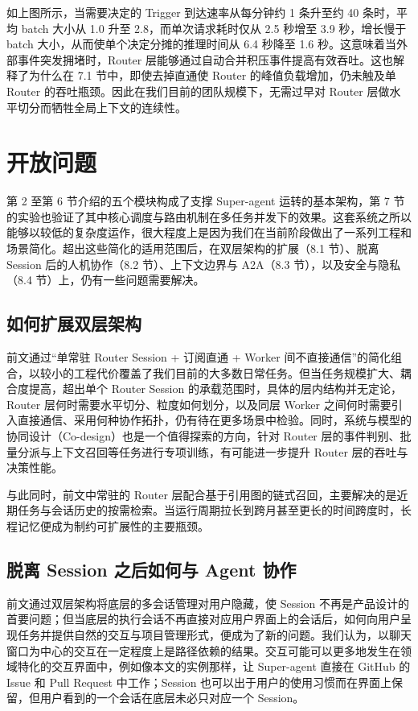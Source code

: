 \documentclass[11pt,a4paper,UTF8,fontset=windows]{ctexart}
\begin{document}
如上图所示，当需要决定的 Trigger 到达速率从每分钟约 1 条升至约 40 条时，平均 batch 大小从 1.0 升至 2.8，而单次请求耗时仅从 2.5 秒增至 3.9 秒，增长慢于 batch 大小，从而使单个决定分摊的推理时间从 6.4 秒降至 1.6 秒。这意味着当外部事件突发拥堵时，Router 层能够通过自动合并积压事件提高有效吞吐。这也解释了为什么在 7.1 节中，即使去掉直通使 Router 的峰值负载增加，仍未触及单 Router 的吞吐瓶颈。因此在我们目前的团队规模下，无需过早对 Router 层做水平切分而牺牲全局上下文的连续性。



\section{开放问题}

第 2 至第 6 节介绍的五个模块构成了支撑 Super-agent 运转的基本架构，第 7 节的实验也验证了其中核心调度与路由机制在多任务并发下的效果。这套系统之所以能够以较低的复杂度运作，很大程度上是因为我们在当前阶段做出了一系列工程和场景简化。超出这些简化的适用范围后，在双层架构的扩展（8.1 节）、脱离 Session 后的人机协作（8.2 节）、上下文边界与 A2A（8.3 节），以及安全与隐私（8.4 节）上，仍有一些问题需要解决。

\subsection{如何扩展双层架构}

前文通过“单常驻 Router Session + 订阅直通 + Worker 间不直接通信”的简化组合，以较小的工程代价覆盖了我们目前的大多数日常任务。但当任务规模扩大、耦合度提高，超出单个 Router Session 的承载范围时，具体的层内结构并无定论，Router 层何时需要水平切分、粒度如何划分，以及同层 Worker 之间何时需要引入直接通信、采用何种协作拓扑，仍有待在更多场景中检验。同时，系统与模型的协同设计（Co-design）也是一个值得探索的方向，针对 Router 层的事件判别、批量分派与上下文召回等任务进行专项训练，有可能进一步提升 Router 层的吞吐与决策性能。

与此同时，前文中常驻的 Router 层配合基于引用图的链式召回，主要解决的是近期任务与会话历史的按需检索。当运行周期拉长到跨月甚至更长的时间跨度时，长程记忆便成为制约可扩展性的主要瓶颈。

\subsection{脱离 Session 之后如何与 Agent 协作}

前文通过双层架构将底层的多会话管理对用户隐藏，使 Session 不再是产品设计的首要问题；但当底层的执行会话不再直接对应用户界面上的会话后，如何向用户呈现任务并提供自然的交互与项目管理形式，便成为了新的问题。我们认为，以聊天窗口为中心的交互在一定程度上是路径依赖的结果。交互可能可以更多地发生在领域特化的交互界面中，例如像本文的实例那样，让 Super-agent 直接在 GitHub 的 Issue 和 Pull Request 中工作；Session 也可以出于用户的使用习惯而在界面上保留，但用户看到的一个会话在底层未必只对应一个 Session。
\end{document}
